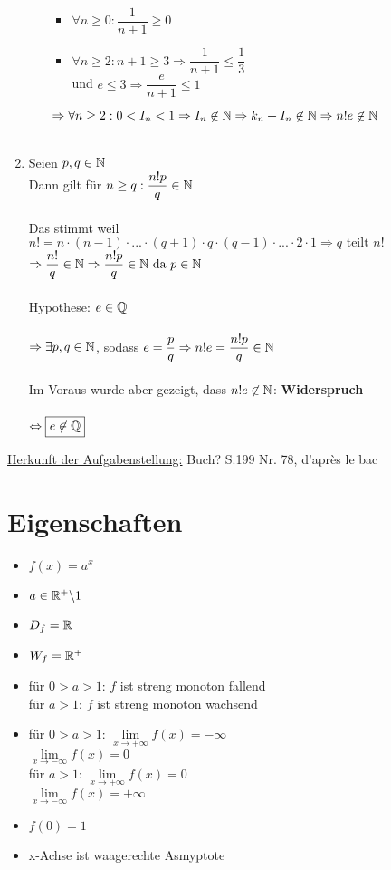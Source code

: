 \begin{Beweis}
\begin{enumerate}
\begin{enumerate}
\begin{itemize}
				\item $\forall n\geq0:\dfrac{1}{n+1}\geq 0$
				\item $\forall n\geq2:n+1\geq3\Rightarrow \dfrac{1}{n+1}\leq \dfrac{1}{3}$\\
					und $e\leq3 \Rightarrow \dfrac{e}{n+1}\leq 1$\\
		\end{itemize}
$\Rightarrow\forall n\geq2:0<I_n<1\Rightarrow I_n\not\in\mathbb{N}\Rightarrow k_n+I_n\not\in\mathbb{N}\Rightarrow n!e\not\in\mathbb{N}$\\\\\end{enumerate}
\item Seien $p, q \in\mathbb{N}$\\
Dann gilt für $n\geq q:\dfrac{n!p}{q}\in\mathbb{N}$\\\\
Das stimmt weil $n!=n\cdot(n-1)\cdot...\cdot(q+1)\cdot q\cdot(q-1)\cdot...\cdot2\cdot1\Rightarrow q \text{ teilt }n!$
$\Rightarrow \dfrac{n!}{q}\in\mathbb{N}\Rightarrow\dfrac{n!p}{q}\in\mathbb{N}\text{ da }p\in\mathbb{N}$\\\\
Hypothese: $e\in\mathbb{Q}$\\\\
$\Rightarrow \exists p,q \in\mathbb{N}$, sodass $e=\dfrac{p}{q}\\
\Rightarrow n!e=\dfrac{n!p}{q}\in\mathbb{N}$\\\\
Im Voraus wurde aber gezeigt, dass $n!e\not\in\mathbb{N}$: \textbf{Widerspruch}\\\\
$\Leftrightarrow \boxed{e\not\in\mathbb{Q}}$\\
\end{enumerate}
\underline{Herkunft der Aufgabenstellung:} Buch? S.199 Nr. 78, d'après le bac
\end{Beweis}
\newpage
\section{Eigenschaften}

\begin{itemize}
\item$f(x)=a^x$
\item$a\in\mathbb{R}^+\backslash 1$
\item$D_f=\mathbb{R}$
\item$W_f=\mathbb{R}^+$
\item für $0>a>1$: $f$ ist streng monoton fallend\\
für $a>1$: $f$ ist streng monoton wachsend
\item für $0>a>1$: $\lim\limits_{x\to +\infty}f(x)=-\infty$\\
			$\lim\limits_{x\to -\infty}f(x)=0$\\
für $a>1$: $\lim\limits_{x\to +\infty}f(x)=0$\\
	        $\lim\limits_{x\to -\infty}f(x)=+\infty$
\item $f(0)=1$
\item x-Achse ist waagerechte Asmyptote

\end{itemize}


